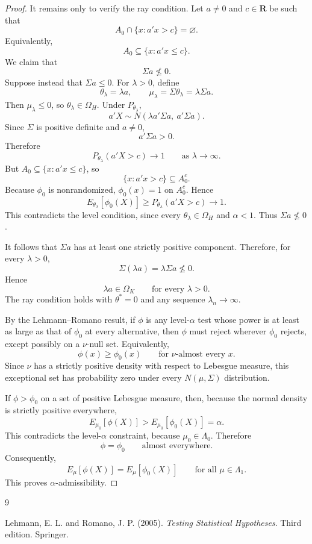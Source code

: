 \documentclass[11pt]{article}
\begin{document}
\begin{proof}
It remains only to verify the ray condition. Let \(a\ne 0\) and \(c\in\mathbf R\) be such that
\[
A_0\cap\{x:a'x>c\}=\varnothing.
\]
Equivalently,
\[
A_0\subseteq\{x:a'x\le c\}.
\]
We claim that
\[
\Sigma a\not\le 0.
\]
Suppose instead that \(\Sigma a\le 0\). For \(\lambda>0\), define
\[
\theta_\lambda=\lambda a,
\qquad
\mu_\lambda=\Sigma\theta_\lambda=\lambda\Sigma a.
\]
Then \(\mu_\lambda\le 0\), so \(\theta_\lambda\in\Omega_H\). Under \(P_{\theta_\lambda}\),
\[
a'X\sim N\left(\lambda a'\Sigma a,\ a'\Sigma a\right).
\]
Since \(\Sigma\) is positive definite and \(a\ne 0\),
\[
a'\Sigma a>0.
\]
Therefore
\[
P_{\theta_\lambda}(a'X>c)\to 1
\qquad\text{as }\lambda\to\infty.
\]
But \(A_0\subseteq\{x:a'x\le c\}\), so
\[
\{x:a'x>c\}\subseteq A_0^c.
\]
Because \(\phi_0\) is nonrandomized, \(\phi_0(x)=1\) on \(A_0^c\). Hence
\[
E_{\theta_\lambda}[\phi_0(X)]
\ge
P_{\theta_\lambda}(a'X>c)
\to 1.
\]
This contradicts the level condition, since every \(\theta_\lambda\in\Omega_H\) and \(\alpha<1\). Thus \(\Sigma a\not\le 0\).

It follows that \(\Sigma a\) has at least one strictly positive component. Therefore, for every \(\lambda>0\),
\[
\Sigma(\lambda a)=\lambda\Sigma a\not\le 0.
\]
Hence
\[
\lambda a\in\Omega_K
\qquad\text{for every }\lambda>0.
\]
The ray condition holds with \(\theta^*=0\) and any sequence \(\lambda_n\to\infty\).

By the Lehmann--Romano result, if \(\phi\) is any level-\(\alpha\) test whose power is at least as large as that of \(\phi_0\) at every alternative, then \(\phi\) must reject wherever \(\phi_0\) rejects, except possibly on a \(\nu\)-null set. Equivalently,
\[
\phi(x)\ge \phi_0(x)
\qquad\text{for }\nu\text{-almost every }x.
\]
Since \(\nu\) has a strictly positive density with respect to Lebesgue measure, this exceptional set has probability zero under every \(N(\mu,\Sigma)\) distribution.

If \(\phi>\phi_0\) on a set of positive Lebesgue measure, then, because the normal density is strictly positive everywhere,
\[
E_{\mu_0}[\phi(X)]>E_{\mu_0}[\phi_0(X)]=\alpha.
\]
This contradicts the level-\(\alpha\) constraint, because \(\mu_0\in\Lambda_0\). Therefore
\[
\phi=\phi_0
\qquad\text{almost everywhere}.
\]
Consequently,
\[
E_\mu[\phi(X)]=E_\mu[\phi_0(X)]
\qquad\text{for all }\mu\in\Lambda_1.
\]
This proves \(\alpha\)-admissibility.
\end{proof}

\begin{thebibliography}{9}

Lehmann, E. L. and Romano, J. P. (2005).
\textit{Testing Statistical Hypotheses}.
Third edition. Springer.

\end{thebibliography}
\end{document}
